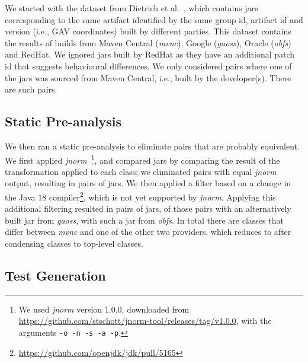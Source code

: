 \documentclass[conference]{IEEEtran}
\newcommand{\inputgen}[1]{\unskip}
\begin{document}
We started with the dataset from Dietrich et al.~\cite{dietrich2024levelsbinaryequivalencecomparison}, which contains jars corresponding to the same artifact identified by the same group id, artifact id and version (i.e., GAV coordinates) built by different parties. This dataset contains the results of builds from Maven Central (\textit{mvnc}), Google (\textit{gaoss}), Oracle (\textit{obfs}) and  RedHat. We ignored jars built by RedHat as they have an additional patch id that suggests behavioural differences.  We only considered pairs where one of the jars was sourced from Maven Central, i.e., built by the developer(s). There are \inputgen{num-pairs-of-binaries} such pairs.


\subsection{Static Pre-analysis}

We then ran a static pre-analysis to eliminate pairs that are probably equivalent. We first applied \textit{jnorm}~\cite{schott2024JNorm}\footnote{We used \textit{jnorm} version 1.0.0, downloaded from \url{https://github.com/stschott/jnorm-tool/releases/tag/v1.0.0}, with the arguments \texttt{-o -n -s -a -p}.}, and compared jars by comparing the result of the transformation applied to each class; we eliminated pairs with equal \textit{jnorm} output, resulting in \inputgen{num-jar-pairs-after-jnorm2} pairs of jars. We then applied a filter based on a change in the Java 18 compiler\footnote{\url{https://github.com/openjdk/jdk/pull/5165}}, which is not yet supported by \textit{jnorm}. Applying this additional filtering resulted in \inputgen{num-jar-pairs-after-invokevirtual-invokeinterface} pairs of jars, \inputgen{num-jar-pairs-after-invokevirtual-invokeinterface-gaoss} of those pairs with an alternatively built jar from \textit{gaoss}, \inputgen{num-jar-pairs-after-invokevirtual-invokeinterface-obfs} with such a jar from \textit{obfs}.
In total there are \inputgen{num-class-pairs-after-invokevirtual-invokeinterface} classes that differ between \textit{mvnc} and one of the other two providers, which reduces to \inputgen{num-top-level-class-pairs-after-invokevirtual-invokeinterface} after condensing classes to top-level classes.



\subsection{Test Generation}
\end{document}
